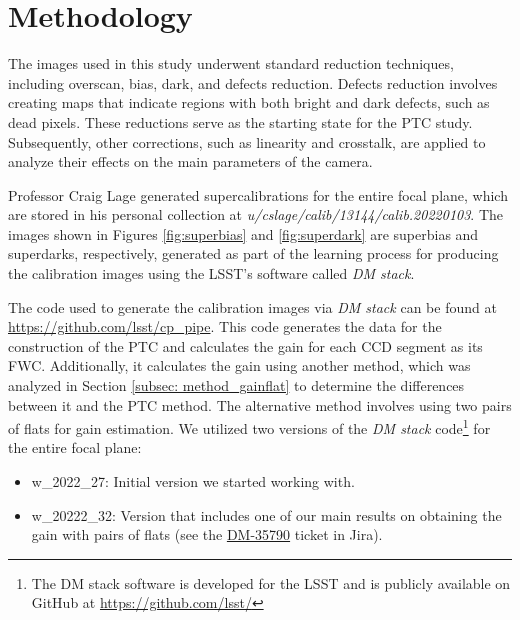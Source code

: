 \section{Methodology} \label{sec:methods}

The images used in this study underwent standard reduction techniques, including overscan, bias, dark, and defects reduction. Defects reduction involves creating maps that indicate regions with both bright and dark defects, such as dead pixels. These reductions serve as the starting state for the PTC study. Subsequently, other corrections, such as linearity and crosstalk, are applied to analyze their effects on the main parameters of the camera.

\vspace{3mm}
Professor Craig Lage generated supercalibrations for the entire focal plane, which are stored in his personal collection at \textit{u/cslage/calib/13144/calib.20220103}. The images shown in Figures \ref{fig:superbias} and \ref{fig:superdark} are superbias and superdarks, respectively, generated as part of the learning process for producing the calibration images using the LSST's software called \textit{DM stack}.

\vspace{3mm}
The code used to generate the calibration images via \textit{DM stack} can be found at \\ \href{https://github.com/lsst/cp_pipe}{https://github.com/lsst/cp\_pipe}. This code generates the data for the construction of the PTC and calculates the gain for each CCD segment as its FWC. Additionally, it calculates the gain using another method, which was analyzed in Section \ref{subsec: method_gainflat} to determine the differences between it and the PTC method. The alternative method involves using two pairs of flats for gain estimation. We utilized two versions of the \textit{DM stack} code\footnote{The DM stack software is developed for the LSST and is publicly available on GitHub at \href{https://github.com/lsst/}{https://github.com/lsst/}} for the entire focal plane:

\begin{itemize}
    \item w\_2022\_27: Initial version we started working with.
    \item w\_20222\_32: Version that includes one of our main results on obtaining the gain with pairs of flats (see the \href{https://jira.lsstcorp.org/browse/DM-35790}{DM-35790} ticket in Jira).
\end{itemize}

